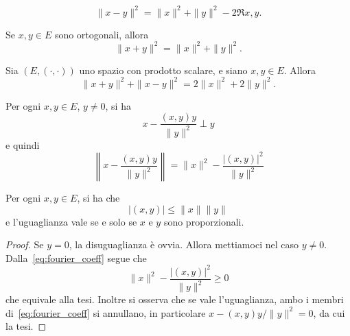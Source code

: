 \begin{lemma}
	\begin{equation}
		\label{eq:carnot}
			\|x-y\|^2 = \|x\|^2 + \|y\|^2 - 2 \Re{x,y}.
		\end{equation}
\end{lemma}

\begin{lemma}
	Se $x,y \in E$ sono ortogonali, allora
	\begin{equation*}
		\|x+y\|^2 = \|x\|^2+\|y\|^2.
	\end{equation*}
\end{lemma}

\begin{lemma}
\label{lemma:par_identity}
	Sia $(E, (\cdot,\cdot))$ uno spazio con prodotto scalare, e siano $x,y \in E$.
	Allora
	\begin{equation*}
		\|x+y\|^2 + \|x-y\|^2 = 2\|x\|^2 + 2\|y\|^2.
	\end{equation*}
\end{lemma}

\begin{corollary}
	Per ogni $x,y \in E$, $y \neq 0$, si ha
	\begin{equation*}
		x - \frac{(x,y)y}{\|y\|^2} \perp y
	\end{equation*}
	e quindi
	\begin{equation}
	\label{eq:fourier_coeff}
		\left\|x - \frac{(x,y)y}{\|y\|^2}\right\| = \|x\|^2 - \frac{|(x,y)|^2}{\|y\|^2}
	\end{equation}
\end{corollary}

\begin{lemma}
	Per ogni $x,y \in E$, si ha che
	\begin{equation*}
		|(x,y)| \leq \|x\| \|y\|
	\end{equation*}
	e l'uguaglianza vale se e solo se $x$ e $y$ sono proporzionali.
\end{lemma}
\begin{proof}
	Se $y=0$, la disuguaglianza è ovvia. Allora mettiamoci nel caso $y \neq 0$. Dalla~\eqref{eq:fourier_coeff} segue che
	\begin{equation*}
		\|x\|^2 - \frac{|(x,y)|^2}{\|y\|^2} \geq 0
	\end{equation*}
	che equivale alla tesi. Inoltre si osserva che se vale l'uguaglianza, ambo i membri di~\eqref{eq:fourier_coeff} si annullano, in particolare $x-(x,y)y/\|y\|^2 = 0$, da cui la tesi.
\end{proof}

